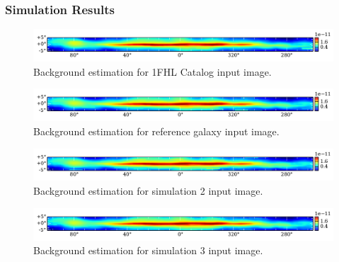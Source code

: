 \documentclass{PoS}
\begin{document}
\subsubsection{Simulation Results}

\begin{figure}
  \begin{center}
      \includegraphics[width=\textwidth]{figures/BG_1FHL.pdf}
  \caption{Background estimation for 1FHL Catalog input image.}
  \end{center}
\end{figure}

\begin{figure}
  \begin{center}
      \includegraphics[width=\textwidth]{figures/BG_SIM1.pdf}
  \caption{Background estimation for reference galaxy input image.}
  \end{center}
\end{figure}

\begin{figure}
  \begin{center}
      \includegraphics[width=\textwidth]{figures/BG_SIM2.pdf}
  \caption{Background estimation for simulation 2 input image.}
  \end{center}
\end{figure}

\begin{figure}
  \begin{center}
      \includegraphics[width=\textwidth]{figures/BG_SIM3.pdf}
  \caption{Background estimation for simulation 3 input image.}
  \end{center}
\end{figure}
\end{document}
